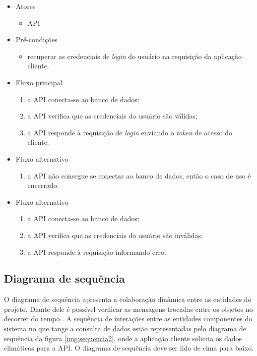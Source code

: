 \begin{itemize}
    \item Atores
    \begin{itemize}
        \item API
    \end{itemize}

    \item Pré-condições
    \begin{itemize}
        \item recuperar as credenciais de \textit{login} do usuário na requisição da aplicação cliente.
    \end{itemize}

    \item Fluxo principal
    \begin{enumerate}
        \item a API conecta-se ao banco de dados;
        \item a API verifica que as credenciais do usuário são válidas;
        \item a API responde à requisição de \textit{login} enviando o \textit{token} de acesso do cliente.
    \end{enumerate}

	\item Fluxo alternativo
    \begin{enumerate}
        \item a API não consegue se conectar ao banco de dados, então o caso de uso é encerrado.
    \end{enumerate}
    
    \item Fluxo alternativo
    \begin{enumerate}
        \item a API conecta-se ao banco de dados;
        \item a API verifica que as credenciais do usuário são inválidas;
        \item a API responde à requisição informando erro.
    \end{enumerate}
\end{itemize}


\subsection{Diagrama de sequência} \label{subsec:diagSeq}

O diagrama de sequência apresenta a colaboração dinâmica entre as entidades do projeto. Diante dele é possível verificar as mensagens trocadas entre os objetos no decorrer do tempo \cite{SITESEQ}. A sequência de interações entre as entidades componentes do sistema no que tange a consulta de dados estão representadas pelo diagrama de sequência da figura \ref{img:sequencia2}, onde a aplicação cliente solicita os dados climáticos para a API. O diagrama de sequência deve ser lido de cima para baixo.

